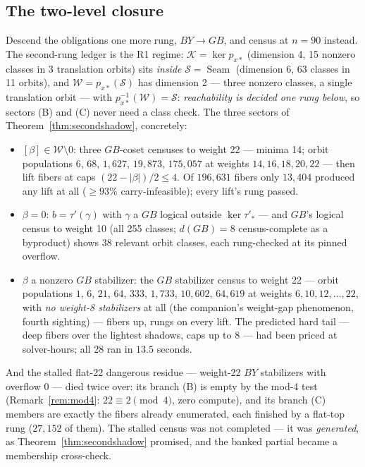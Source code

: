 \documentclass[11pt]{article}
\theoremstyle{plain}
\theoremstyle{definition}
\theoremstyle{remark}
\newcommand{\Seam}{\operatorname{Seam}}
\newcommand{\wt}[1]{\lvert #1\rvert}
\begin{document}
\subsection{The two-level closure}

Descend the obligations one more rung, $BY \to GB$, and census at
$n = 90$ instead. The second-rung ledger is the R1 regime:
$\mathcal{K} = \ker p_{x*}$ (dimension 4, 15 nonzero classes in 3
translation orbits) sits \emph{inside} $\mathcal{S} = \Seam$ (dimension
6, 63 classes in 11 orbits), and $\mathcal{W} = p_{x*}(\mathcal{S})$ has
dimension 2 --- three nonzero classes, a single translation orbit ---
with $p_{x*}^{-1}(\mathcal{W}) = \mathcal{S}$: \emph{reachability is
decided one rung below}, so sectors (B) and (C) never need a class check.
The three sectors of Theorem~\ref{thm:secondshadow}, concretely:

\begin{itemize}[leftmargin=2em]
\item[\emph{(A)}] $[\beta] \in \mathcal{W}\setminus 0$: three $GB$-coset
  censuses to weight 22 --- minima 14; orbit populations $6$, $68$,
  $1{,}627$, $19{,}873$, $175{,}057$ at weights $14, 16, 18, 20, 22$ ---
  then lift fibers at caps $(22 - \wt\beta)/2 \leq 4$. Of $196{,}631$
  fibers only $13{,}404$ produced any lift at all ($\geq 93\%$
  carry-infeasible); every lift's rung passed.
\item[\emph{(B)}] $\beta = 0$: $b = \tau'(\gamma)$ with $\gamma$ a $GB$
  logical outside $\ker\tau'_*$ --- and $GB$'s logical census to weight
  10 (all 255 classes; $d(GB) = 8$ census-complete as a byproduct) shows
  38 relevant orbit classes, each rung-checked at its pinned overflow.
\item[\emph{(C)}] $\beta$ a nonzero $GB$ stabilizer: the $GB$ stabilizer
  census to weight 22 --- orbit populations $1$, $6$, $21$, $64$, $333$,
  $1{,}733$, $10{,}602$, $64{,}619$ at weights $6, 10, 12, \dots, 22$,
  with \emph{no weight-8 stabilizers} at all (the companion's weight-gap
  phenomenon, fourth sighting) --- fibers up, rungs on every lift. The
  predicted hard tail --- deep fibers over the lightest shadows, caps up
  to 8 --- had been priced at solver-hours; all 28 ran in $13.5$
  seconds.
\end{itemize}

And the stalled flat-22 dangerous residue --- weight-22 $BY$ stabilizers
with overflow 0 --- died twice over: its branch (B) is empty by the mod-4
test (Remark~\ref{rem:mod4}: $22 \equiv 2 \pmod 4$, zero compute), and
its branch (C) members are exactly the fibers already enumerated, each
finished by a flat-top rung ($27{,}152$ of them). The stalled census was
not completed --- it was \emph{generated}, as
Theorem~\ref{thm:secondshadow} promised, and the banked partial became a
membership cross-check.
\end{document}

